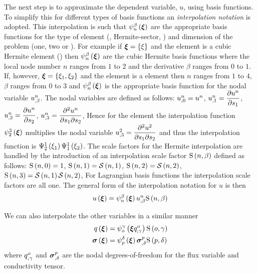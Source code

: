 The next step is to approximate the dependent variable, $u$, using basis
functions. To simplify this for different types of basis functions an
\emph{interpolation notation} is adopted. This interpolation is such that
$   \psi_{n}^{\beta} \left( \boldsymbol{\xi} \right)  $ are the appropriate basis functions for the
type of element (\eg \bicubicherm, Hermite-sector, \etc) and dimension of 
the problem (one, two or \threedal). For example if $\boldsymbol{\xi}=\left\{ \xi \right\}$ 
and the element is a cubic Hermite element
() then $   \psi_{n}^{\beta} \left( \boldsymbol{\xi} \right)  $ 
are the cubic Hermite basis functions where the local node number $n$ ranges 
from $1$ to $2$ and the derivative $\beta$ ranges from $0$ to $1$. If,
however, $\boldsymbol{\xi}=\left\{ \xi_{1},\xi_{2} \right\}$ and the element is a \bicubicherm 
element then $n$ ranges from $1$ to $4$, $\beta$ ranges from $0$ to $3$ and
$   \psi_{n}^{\beta} \left( \boldsymbol{\xi} \right)  $ is the appropriate basis function for the nodal
variable $  {u}^{n} _{,\beta} $. The nodal variables are defined as
follows: $  {u}^{n} _{,0} = {u}^{n} $,
$  {u}^{n} _{,1} = \dfrac{\partial  {u}^{n} }{\partial s_{1}} $,
$  {u}^{n} _{,2} = \dfrac{\partial  {u}^{n} }{\partial s_{2}} $,
$  {u}^{n} _{,3} = \dfrac{\partial^{2}  {u}^{n} }{\partial s_{1} \partial s_{2}} $,
\etc Hence for the \bicubicherm element the interpolation function
$   \psi_{2}^{3} \left( \boldsymbol{\xi} \right)  $ multiplies the nodal variable
$  {u}^{2} _{,3} = \dfrac{\partial^{2} u^{2}}{\partial s_{1} \partial s_{2}} $ and thus the
interpolation function is $   \Psi_{2}^{1} \left( \xi_{1} \right)     \Psi_{1}^{1} \left( \xi_{2} \right)  $.  The
scale factors for the Hermite interpolation are handled by the introduction of
an interpolation scale factor $   \mathrm{S} \left( n,\beta \right)  $ defined as follows:
$   \mathrm{S} \left( n,0 \right)  =1$, $   \mathrm{S} \left( n,1 \right)  =   \mathcal{S} \left( n,1 \right)  $, $   \mathrm{S} \left( n,2 \right)  =
   \mathcal{S} \left( n,2 \right)  $, $   \mathrm{S} \left( n,3 \right)  =   \mathcal{S} \left( n,1 \right)     \mathcal{S} \left( n,2 \right)  $,
\etc For Lagrangian basis functions the interpolation scale factors are all
one. The general form of the interpolation notation for $u$ is then
\begin{equation}
  \fnof{u}{\vectr{\xi}}=\gbfn{n}{\beta}{\vectr{\xi}}\nodedof{u}{n}{\beta}\gsf{n}{\beta}
  \label{eqn:uinterpolation}
\end{equation}

We can also interpolate the other variables in a similar manner \ie
\begin{equation}
  \begin{split}
     q\left( \boldsymbol{\xi} \right)  &=    \psi_{o}^{\gamma} \left( \boldsymbol{\xi}  {q}^{o} _{,\gamma}  \right)  
       \mathrm{S} \left( o,\gamma \right)   \\
     \boldsymbol{\mathit{\sigma}}\left( \boldsymbol{\xi} \right) 
    &=   \psi_{p}^{\delta} \left( \boldsymbol{\xi} \right)    {\boldsymbol{\mathit{\sigma}}}^{p} _{,\delta}    \mathrm{S} \left( p,\delta \right)   \\
  \end{split}
\end{equation}
where $  {q}^{o} _{,\gamma} $ and $  {\boldsymbol{\mathit{\sigma}}}^{p} _{,\delta} $ are the
nodal degrees-of-freedom for the flux variable and conductivity tensor.

